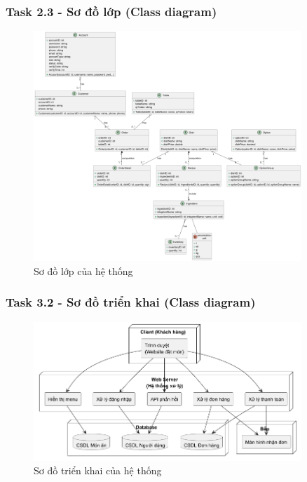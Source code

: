 \documentclass[a4paper]{article}
\begin{document}
\begin{itemize}
        \subsubsection{Task 2.3 - Sơ đồ lớp (Class diagram)}
        \begin{figure}[H]
            \centering
            \includegraphics[width=0.9\textwidth]{task23.png}
            \caption{Sơ đồ lớp của hệ thống}
            \label{fig:task23}
        \end{figure}
        \subsubsection{Task 3.2 - Sơ đồ triển khai (Class diagram)}
        \begin{figure}[H]
            \centering
            \includegraphics[width=0.9\textwidth]{task32.png}
            \caption{Sơ đồ triển khai của hệ thống}
            \label{fig:task32}
        \end{figure}
    

\end{itemize}
\end{document}
